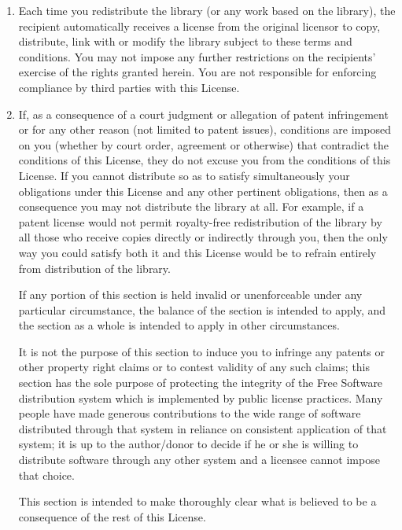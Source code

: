 \documentclass[11pt, letterpaper]{book}
\begin{document}
\begin{enumerate}
\item

  Each time you redistribute the library (or any work based on the
  library), the recipient automatically receives a license from the
  original licensor to copy, distribute, link with or modify the library
  subject to these terms and conditions. You may not impose any further
  restrictions on the recipients' exercise of the rights granted herein.
  You are not responsible for enforcing compliance by third parties with
  this License.

\item

  If, as a consequence of a court judgment or allegation of patent
  infringement or for any other reason (not limited to patent issues),
  conditions are imposed on you (whether by court order, agreement or
  otherwise) that contradict the conditions of this License, they do not
  excuse you from the conditions of this License. If you cannot
  distribute so as to satisfy simultaneously your obligations under this
  License and any other pertinent obligations, then as a consequence you
  may not distribute the library at all. For example, if a patent license
  would not permit royalty-free redistribution of the library by all those
  who receive copies directly or indirectly through you, then the only way
  you could satisfy both it and this License would be to refrain entirely
  from distribution of the library.

  If any portion of this section is held invalid or unenforceable under
  any particular circumstance, the balance of the section is intended to
  apply, and the section as a whole is intended to apply in other
  circumstances.

  It is not the purpose of this section to induce you to infringe any
  patents or other property right claims or to contest validity of any
  such claims; this section has the sole purpose of protecting the
  integrity of the Free Software distribution system which is implemented
  by public license practices. Many people have made generous
  contributions to the wide range of software distributed through that
  system in reliance on consistent application of that system; it is up to
  the author/donor to decide if he or she is willing to distribute
  software through any other system and a licensee cannot impose that
  choice.

  This section is intended to make thoroughly clear what is believed to be
  a consequence of the rest of this License.



\end{enumerate}
\end{document}

